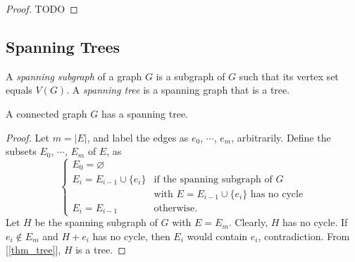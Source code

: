         \begin{proof}
            TODO
            
            
        \end{proof}
    
    \subsection{Spanning Trees}
        \begin{defn} \label{def_spanning}
            A \emph{spanning subgraph} of a graph $G$ is a subgraph of $G$ such that its vertex set equals $V(G)$. A \emph{spanning tree} is a spanning graph that is a tree.
        \end{defn}
        
        \begin{thm} \label{thm_spanning_tree}
            A connected graph $G$ has a spanning tree.
        \end{thm}
        
        \begin{proof}
            Let $m = |E|$, and label the edges as $e_0$, $\cdots$, $e_m$, arbitrarily. Define the subsets $E_0$, $\cdots$, $E_m$ of $E$, as \begin{displaymath} \begin{cases}
                E_0 = \varnothing \\
                E_i = E_{i-1} \cup \{e_i\} & \text{if the spanning subgraph of $G$} \\
                & \text{with $E = E_{i-1} \cup \{e_i\}$ has no cycle} \\
                E_i = E_{i-1} & \text{otherwise.}
            \end{cases} \end{displaymath}
            Let $H$ be the spanning subgraph of $G$ with $E = E_m$. Clearly, $H$ has no cycle. If $e_i \notin E_m$ and $H+e_i$ has no cycle, then $E_i$ would contain $e_i$, contradiction. From [\ref{thm_tree}], $H$ is a tree.
        \end{proof}
        
